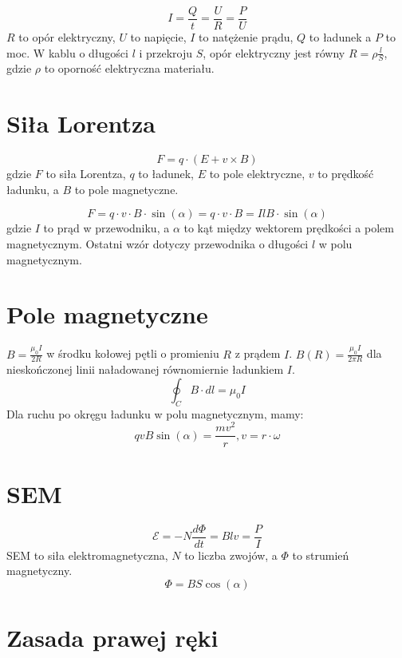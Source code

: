 \documentclass{../konspekt}
\begin{document}
\begin{multicols}{2}
  $$
  I = \frac{Q}{t} = \frac{U}{R} = \frac{P}{U}
  $$
  $R$ to opór elektryczny, $U$ to napięcie, $I$ to natężenie prądu,
  $Q$ to ładunek a $P$ to moc. W kablu o długości $l$ i przekroju $S$,
  opór elektryczny jest równy $R = \rho \frac{l}{S}$, gdzie $\rho$ to
  oporność elektryczna materiału.

  \section{Siła Lorentza}

  $$
  F = q \cdot (E + v \times B)
  $$
  gdzie $F$ to siła Lorentza, $q$ to ładunek, $E$ to pole elektryczne,
  $v$ to prędkość ładunku, a $B$ to pole magnetyczne.

  $$
  F = q \cdot v \cdot B \cdot \sin(\alpha) = q \cdot v \cdot B =
  IlB \cdot \sin(\alpha)
  $$
  gdzie $I$ to prąd w przewodniku,
  a $\alpha$ to kąt między wektorem prędkości a polem magnetycznym.
  Ostatni wzór dotyczy przewodnika o długości $l$ w polu magnetycznym.

  \section{Pole magnetyczne}

  $B = \frac{\mu_0 I}{2 R}$ w środku kołowej pętli o promieniu $R$ z prądem $I$.
  $B(R) = \frac{\mu_0 I}{2\pi R}$ dla nieskończonej linii naładowanej
  równomiernie ładunkiem $I$.
  $$
  \oint_{C} B \cdot dl = \mu_0 I
  $$
  Dla ruchu po okręgu ładunku w polu magnetycznym, mamy:
  $$
  qvB \sin(\alpha) = \frac{mv^2}{r}, v = r \cdot \omega
  $$

  \section{SEM}

  $$
  \mathcal{E} = -N \frac{d \Phi}{dt} = Blv = \frac{P}{I}
  $$
  SEM to siła elektromagnetyczna, $N$ to liczba zwojów, a $\Phi$
  to strumień magnetyczny.
  $$
  \Phi = BS \cos(\alpha)
  $$

  \section{Zasada prawej ręki}

  \begin{center}
\end{center}
\end{multicols}
\end{document}
